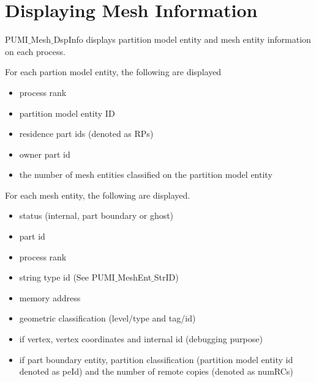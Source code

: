 
\section{Displaying Mesh Information}\label{sec:minfo}

PUMI$\_$Mesh$\_$DspInfo displays partition model entity and mesh entity information on each process.

For each partion model entity, the following are displayed
  \begin{itemize}
  \item process rank
  \item partition model entity ID
  \item residence part ids (denoted as RPs)
  \item owner part id
  \item the number of mesh entities classified on the partition model entity
  \end{itemize}

For each mesh entity, the following are displayed.
  \begin{itemize}
  \item status (internal, part boundary or ghost)
  \item  part id
  \item process rank
  \item string type id (See PUMI$\_$MeshEnt$\_$StrID)
  \item memory address
  \item geometric classification (level/type and tag/id)
  \item if vertex, vertex coordinates and internal id (debugging purpose)
  \item if part boundary entity, partition classification (partition model entity id denoted as peId) and the number of remote copies (denoted as numRCs)
  \end{itemize}

